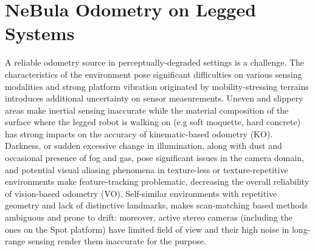 \documentclass[a4paper, 10pt, conference]{ieeeconf}      %
\newcommand{\ph}[1]{{\textbf{#1}:}} %
\newcommand{\todo}[1]{{\color{red} #1 }} %
\begin{document}
\section{NeBula Odometry on Legged Systems}\label{sec:state_estimation}
A reliable odometry source in perceptually-degraded settings is a challenge. The characteristics of the environment pose significant difficulties on various sensing modalities and strong platform vibration originated by mobility-stressing terrains introduces additional uncertainty on sensor measurements. Uneven and slippery areas make inertial sensing inaccurate while the material composition of the surface where the legged robot is walking on (e.g soft moquette, hard concrete) has strong impacts on the accuracy of kinematic-based odometry (KO). Darkness, or sudden excessive change in illumination, along with dust and occasional presence of fog and gas, pose significant issues in the camera domain, and potential visual aliasing phenomena in texture-less or texture-repetitive environments make feature-tracking problematic, decreasing the overall reliability of vision-based odometry (VO). Self-similar environments with repetitive geometry and lack of distinctive landmarks, makes scan-matching based methods ambiguous and prone to drift: moreover, active stereo cameras (including the ones on the Spot platform) have limited field of view and their high noise in long-range sensing render them inaccurate for the purpose. %

\end{document}
